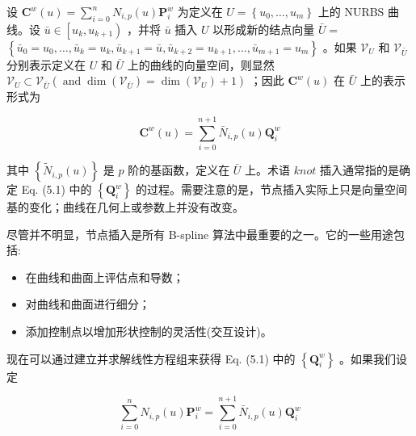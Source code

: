 \documentclass[../main.tex]{subfiles}
\begin{document}
设 \({\mathbf{C}}^{w}\left( u\right)  = \mathop{\sum }\limits_{{i = 0}}^{n}{N}_{i,p}\left( u\right) {\mathbf{P}}_{i}^{w}\) 为定义在 \(U = \left\{  {{u}_{0},\ldots ,{u}_{m}}\right\}\) 上的 NURBS 曲线。设 \(\bar{u} \in  \left\lbrack  {{u}_{k},{u}_{k + 1}}\right)\) ，并将 \(\bar{u}\) 插入 \(U\) 以形成新的结点向量 \(\bar{U} =\)  \(\left\{  {{\bar{u}}_{0} = {u}_{0},\ldots ,{\bar{u}}_{k} = {u}_{k},{\bar{u}}_{k + 1} = \bar{u},{\bar{u}}_{k + 2} = {u}_{k + 1},\ldots ,{\bar{u}}_{m + 1} = {u}_{m}}\right\}\) 。如果 \({\mathcal{V}}_{U}\) 和 \({\mathcal{V}}_{\bar{U}}\) 分别表示定义在 \(U\) 和 \(\bar{U}\) 上的曲线的向量空间，则显然 \({\mathcal{V}}_{U} \subset  {\mathcal{V}}_{\bar{U}}\left( {\operatorname{and}\dim \left( {\mathcal{V}}_{\bar{U}}\right)  = \dim \left( {\mathcal{V}}_{U}\right)  + 1}\right)\) ；因此 \({\mathbf{C}}^{w}\left( u\right)\) 在 \(\bar{U}\) 上的表示形式为

\[
{\mathbf{C}}^{w}\left( u\right)  = \mathop{\sum }\limits_{{i = 0}}^{{n + 1}}{\bar{N}}_{i,p}\left( u\right) {\mathbf{Q}}_{i}^{w} \tag{5.1}
\]

其中 \(\left\{  {{\widetilde{N}}_{i,p}\left( u\right) }\right\}\) 是 \(p\) 阶的基函数，定义在 \(\bar{U}\) 上。术语 \({knot}\) 插入通常指的是确定 Eq. (5.1) 中的 \(\left\{  {\mathbf{Q}}_{i}^{w}\right\}\) 的过程。需要注意的是，节点插入实际上只是向量空间基的变化；曲线在几何上或参数上并没有改变。

尽管并不明显，节点插入是所有 B-spline 算法中最重要的之一。它的一些用途包括:

\begin{itemize}
\item 在曲线和曲面上评估点和导数；
\end{itemize}

\begin{itemize}
\item 对曲线和曲面进行细分；
\end{itemize}

\begin{itemize}
\item 添加控制点以增加形状控制的灵活性(交互设计)。
\end{itemize}

现在可以通过建立并求解线性方程组来获得 Eq. (5.1) 中的 \(\left\{  {\mathbf{Q}}_{i}^{w}\right\}\) 。如果我们设定

\[
\mathop{\sum }\limits_{{i = 0}}^{n}{N}_{i,p}\left( u\right) {\mathbf{P}}_{i}^{w} = \mathop{\sum }\limits_{{i = 0}}^{{n + 1}}{\bar{N}}_{i,p}\left( u\right) {\mathbf{Q}}_{i}^{w} \tag{5.2}
\]
\end{document}
